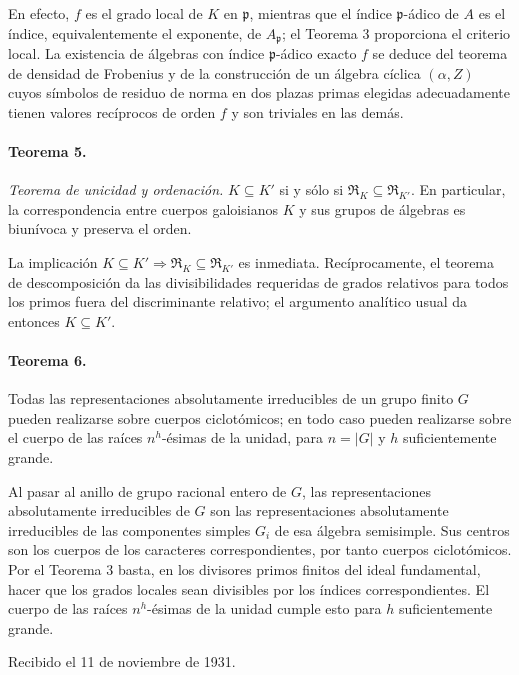 En efecto, \(f\) es el grado local de \(K\) en \(\mathfrak p\), mientras que el índice \(\mathfrak p\)-ádico de \(A\) es el índice, equivalentemente el exponente, de \(A_{\mathfrak p}\); el Teorema 3 proporciona el criterio local. La existencia de álgebras con índice \(\mathfrak p\)-ádico exacto \(f\) se deduce del teorema de densidad de Frobenius y de la construcción de un álgebra cíclica \((\alpha,Z)\) cuyos símbolos de residuo de norma en dos plazas primas elegidas adecuadamente tienen valores recíprocos de orden \(f\) y son triviales en las demás.

\paragraph{Teorema 5.}
\emph{Teorema de unicidad y ordenación.} \(K\subseteq K'\) si y sólo si \(\mathfrak R_K\subseteq\mathfrak R_{K'}\). En particular, la correspondencia entre cuerpos galoisianos \(K\) y sus grupos de álgebras es biunívoca y preserva el orden.

La implicación \(K\subseteq K'\Rightarrow\mathfrak R_K\subseteq\mathfrak R_{K'}\) es inmediata. Recíprocamente, el teorema de descomposición da las divisibilidades requeridas de grados relativos para todos los primos fuera del discriminante relativo; el argumento analítico usual da entonces \(K\subseteq K'\).

\paragraph{Teorema 6.}
Todas las representaciones absolutamente irreducibles de un grupo finito \(G\) pueden realizarse sobre cuerpos ciclotómicos; en todo caso pueden realizarse sobre el cuerpo de las raíces \(n^h\)-ésimas de la unidad, para \(n=|G|\) y \(h\) suficientemente grande.

Al pasar al anillo de grupo racional entero de \(G\), las representaciones absolutamente irreducibles de \(G\) son las representaciones absolutamente irreducibles de las componentes simples \(G_i\) de esa álgebra semisimple. Sus centros son los cuerpos de los caracteres correspondientes, por tanto cuerpos ciclotómicos. Por el Teorema 3 basta, en los divisores primos finitos del ideal fundamental, hacer que los grados locales sean divisibles por los índices correspondientes. El cuerpo de las raíces \(n^h\)-ésimas de la unidad cumple esto para \(h\) suficientemente grande.

\begin{center}
Recibido el 11 de noviembre de 1931.
\end{center}

